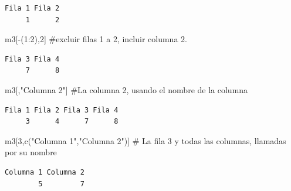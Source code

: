 \documentclass[
  letterpaper,
  DIV=11,
  numbers=noendperiod]{scrreprt}
\newenvironment{Shaded}{\begin{snugshade}}{\end{snugshade}}
\newcommand{\CommentTok}[1]{\textcolor[rgb]{0.37,0.37,0.37}{#1}}
\newcommand{\DecValTok}[1]{\textcolor[rgb]{0.68,0.00,0.00}{#1}}
\newcommand{\FunctionTok}[1]{\textcolor[rgb]{0.28,0.35,0.67}{#1}}
\newcommand{\NormalTok}[1]{\textcolor[rgb]{0.00,0.23,0.31}{#1}}
\newcommand{\SpecialCharTok}[1]{\textcolor[rgb]{0.37,0.37,0.37}{#1}}
\newcommand{\StringTok}[1]{\textcolor[rgb]{0.13,0.47,0.30}{#1}}
\begin{document}
\begin{verbatim}
Fila 1 Fila 2 
     1      2 
\end{verbatim}

\begin{Shaded}
\begin{Highlighting}[]
\NormalTok{m3[}\SpecialCharTok{{-}}\NormalTok{(}\DecValTok{1}\SpecialCharTok{:}\DecValTok{2}\NormalTok{),}\DecValTok{2}\NormalTok{] }\CommentTok{\#excluir filas 1 a 2, incluir columna 2.}
\end{Highlighting}
\end{Shaded}

\begin{verbatim}
Fila 3 Fila 4 
     7      8 
\end{verbatim}

\begin{Shaded}
\begin{Highlighting}[]
\NormalTok{m3[,}\StringTok{"Columna 2"}\NormalTok{] }\CommentTok{\#La columna 2, usando el nombre de la columna}
\end{Highlighting}
\end{Shaded}

\begin{verbatim}
Fila 1 Fila 2 Fila 3 Fila 4 
     3      4      7      8 
\end{verbatim}

\begin{Shaded}
\begin{Highlighting}[]
\NormalTok{m3[}\DecValTok{3}\NormalTok{,}\FunctionTok{c}\NormalTok{(}\StringTok{"Columna 1"}\NormalTok{,}\StringTok{"Columna 2"}\NormalTok{)] }\CommentTok{\# La fila 3 y todas las columnas, llamadas por su nombre}
\end{Highlighting}
\end{Shaded}

\begin{verbatim}
Columna 1 Columna 2 
        5         7 
\end{verbatim}


\hypertarget{section-1}{%
\chapter{}\label{section-1}}
\end{document}
